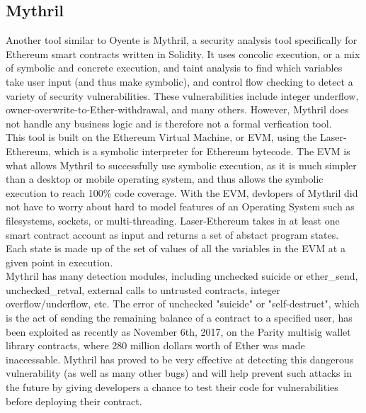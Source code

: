 \subsection*{Mythril}

Another tool similar to Oyente is Mythril, a security analysis tool specifically for Ethereum smart contracts written in Solidity. It uses concolic execution, or a mix of symbolic and concrete execution, and taint analysis to find which variables take user input (and thus make symbolic), and control flow checking to detect a variety of security vulnerabilities. These vulnerabilities include integer underflow, owner-overwrite-to-Ether-withdrawal, and many others. However, Mythril does not handle any business logic and is therefore not a formal verfication tool. \\

This tool is built on the Ethereum Virtual Machine, or EVM, using the Laser-Ethereum, which is a symbolic interpreter for Ethereum bytecode. The EVM is what allows Mythril to successfully use symbolic execution, as it is much simpler than a desktop or mobile operating system, and thus allows the symbolic execution to reach 100\%  code coverage. With the EVM,  devlopers of Mythril did not have to worry about hard to model features of an Operating System such as filesystems, sockets, or multi-threading. Laser-Ethereum takes in at least one smart contract account as input and returns a set of abstact program states. Each state is made up of the set of values of all the variables in the EVM at a given point in execution. \\

Mythril has many detection modules, including unchecked suicide or ether\_send, unchecked\_retval, external calls to untrusted contracts, integer overflow/underflow, etc. The error of unchecked "suicide" or "self-destruct", which is the act of sending the remaining balance of a contract to a specified user, has been exploited as recently as November 6th, 2017,  on the Parity multisig wallet library contracts, where 280 million dollars worth of Ether was made inaccessable. Mythril has proved to be very effective at detecting this dangerous vulnerability (as well as many other bugs) and will help prevent such attacks in the future by giving developers a chance to test their code for vulnerabilities before deploying their contract.

